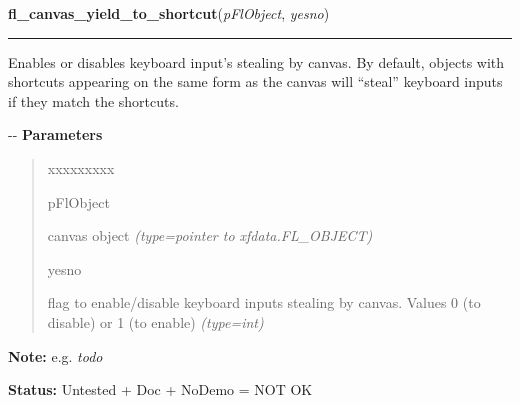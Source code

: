     \label{xformslib:flcanvas:fl_canvas_yield_to_shortcut}

    \vspace{0.5ex}

\hspace{.8\funcindent}\begin{boxedminipage}{\funcwidth}

    \raggedright \textbf{fl\_canvas\_yield\_to\_shortcut}(\textit{pFlObject}, \textit{yesno})

    \vspace{-1.5ex}

    \rule{\textwidth}{0.5\fboxrule}
\setlength{\parskip}{2ex}

Enables or disables keyboard input's stealing by canvas. By default,
objects with shortcuts appearing on the same form as the canvas will
``steal'' keyboard inputs if they match the shortcuts.

-{}-
\setlength{\parskip}{1ex}
      \textbf{Parameters}
      \vspace{-1ex}

      \begin{quote}
        \begin{Ventry}{xxxxxxxxx}

          \item[pFlObject]


canvas object
            {\it (type=pointer to xfdata.FL\_OBJECT)}

          \item[yesno]


flag to enable/disable keyboard inputs stealing by canvas. Values 0
(to disable) or 1 (to enable)
            {\it (type=int)}

        \end{Ventry}

      \end{quote}

\textbf{Note:} 
e.g. \emph{todo}


\textbf{Status:} 
Untested + Doc + NoDemo = NOT OK


    \end{boxedminipage}



